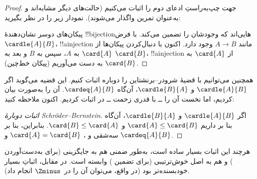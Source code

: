 \documentclass[../../../include/open-logic-section]{subfiles}
\begin{document}
\begin{proof}
جهت چپ‌به‌راستِ ادعای دوم را اثبات می‌کنیم (حالت‌های دیگر مشابه‌اند
و به‌عنوان تمرین واگذار می‌شوند). نمودار زیر را در نظر بگیرید:
\begin{center}
\end{center}
پیکان‌های دوسر نشان‌دهندهٔ !!{bijection}هایی‌اند که وجودشان را
 تضمین می‌کند. با فرض
$\cardle{A}{B}$، !!a{injection} مانند $A\to B$ وجود دارد. اکنون با
دنبال‌کردن پیکان‌ها از $\card{A}$ به $A$، سپس به $B$ و بعد به
$\card{B}$، !!a{injection} از $\card{A}$ به $\card{B}$ به دست
می‌آوریم (پیکان خط‌چین).
\end{proof}\noindent
همچنین می‌توانیم با  قضیهٔ
شرودر--برنشتاین را دوباره اثبات کنیم. این قضیه می‌گوید اگر
$\cardle{A}{B}$ و $\cardle{B}{A}$، آن‌گاه $\cardeq{A}{B}$. آن را
به‌صورت  بیان کردیم، اما
نخست آن را ــ با قدری زحمت ــ در
 اثبات کردیم. اکنون ملاحظه کنید:

\begin{proof}[اثبات دوبارهٔ Schr\"oder--Bernstein]
اگر $\cardle{A}{B}$ و $\cardle{B}{A}$، آن‌گاه بنا بر
 داریم
$\card{A} \leq \card{B}$ و $\card{B} \leq \card{A}$. بنابراین، بنا
بر سه‌شقی و ،
$\card{A} = \card{B}$ و $\cardeq{A}{B}$.
\end{proof}
\noindent
هرچند این اثبات بسیار ساده است، به‌طور ضمنی هم به جایگزینی (برای
به‌دست‌آوردن
) و هم به اصل
خوش‌ترتیبی (برای تضمین ) وابسته
است. در مقابل، اثباتِ  بسیار
خودبسنده‌تر بود (در واقع، می‌توان آن را در~$\Zminus$ انجام داد).
\end{document}

